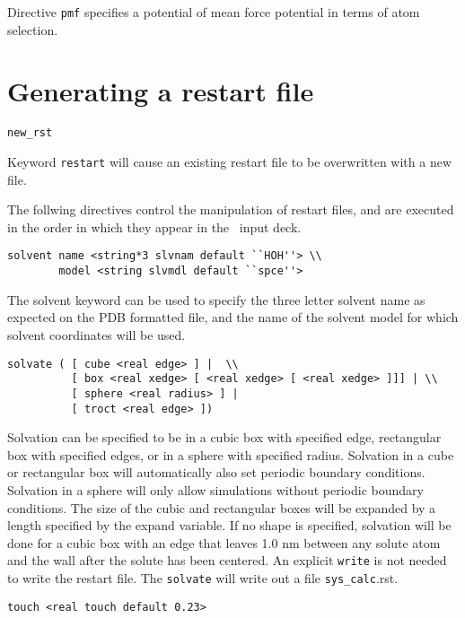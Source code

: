 Directive \verb+pmf+ specifies a potential of mean force potential
in terms of atom selection.

\section{Generating a restart file}

\begin{verbatim}
new_rst
\end{verbatim}

Keyword \verb+restart+ will cause an existing restart file to be
overwritten with a new file.

The follwing directives control the manipulation of restart
files, and are executed in the order in which they
appear in the \prepare\ input deck.

\begin{verbatim}
solvent name <string*3 slvnam default ``HOH''> \\
        model <string slvmdl default ``spce''>
\end{verbatim}

The solvent keyword can be used to specify the three letter solvent name 
as expected on the PDB formatted file, and the name of the solvent model
for which solvent coordinates will be used.

\begin{verbatim}
solvate ( [ cube <real edge> ] |  \\
          [ box <real xedge> [ <real xedge> [ <real xedge> ]]] | \\
          [ sphere <real radius> ] |
          [ troct <real edge> ])
\end{verbatim}

Solvation can be specified to be in a cubic box with specified edge,
rectangular box with specified edges, or in a sphere with specified
radius. Solvation in a cube or rectangular box will automatically also
set periodic boundary conditions. Solvation in a sphere will only allow
simulations without periodic boundary conditions. The size of the cubic
and rectangular boxes will be expanded by a length specified by the
expand variable. If no shape is specified, solvation will be done for
a cubic box with an edge that leaves 1.0 nm between any solute atom and
the wall after the solute has been centered. An explicit \verb+write+
is not needed to write the restart file. The \verb+solvate+ will
write out a file \verb+sys_calc+.rst.

\begin{verbatim}
touch <real touch default 0.23>
\end{verbatim}

